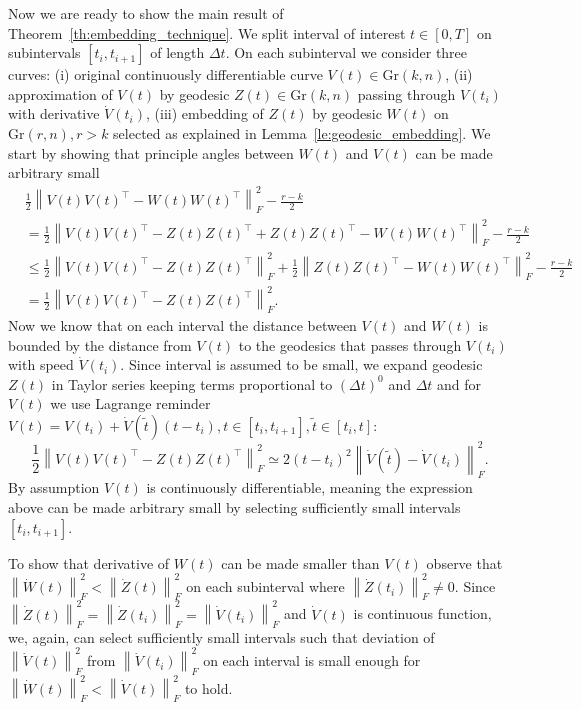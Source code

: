 \documentclass{article}
\begin{document}
Now we are ready to show the main result of Theorem~\ref{th:embedding_technique}. We split interval of interest $t\in[0, T]$ on subintervals $[t_i, t_{i+1}]$ of length $\Delta t$. On each subinterval we consider three curves: (i) original continuously differentiable curve $V(t)\in \text{Gr}(k, n)$, (ii) approximation of $V(t)$ by geodesic $Z(t)\in \text{Gr}(k, n)$ passing through $V(t_i)$ with derivative $\dot{V}(t_i)$, (iii) embedding of $Z(t)$ by geodesic $W(t)$ on $\text{Gr}(r, n), r>k$ selected as explained in Lemma~\ref{le:geodesic_embedding}. We start by showing that principle angles between $W(t)$ and $V(t)$ can be made arbitrary small
\begin{equation}
	\begin{split}
		&\frac{1}{2}\left\|V(t) V(t)^{\top} - W(t) W(t)^{\top}\right\|_{F}^2 - \frac{r - k}{2}\\
		&= \frac{1}{2}\left\|V(t) V(t)^{\top} - Z(t) Z(t)^\top + Z(t) Z(t)^\top - W(t) W(t)^{\top}\right\|_{F}^2 - \frac{r - k}{2} \\
		&\leq \frac{1}{2}\left\|V(t) V(t)^{\top} - Z(t) Z(t)^\top \right\|_{F}^2 + \frac{1}{2} \left\|Z(t) Z(t)^\top - W(t) W(t)^{\top}\right\|_{F}^2 - \frac{r - k}{2} \\
		&= \frac{1}{2}\left\|V(t) V(t)^{\top} - Z(t) Z(t)^\top \right\|_{F}^2.
	\end{split}
\end{equation}
Now we know that on each interval the distance between $V(t)$ and $W(t)$ is bounded by the distance from $V(t)$ to the geodesics that passes through $V(t_i)$ with speed $\dot{V}(t_i)$. Since interval is assumed to be small, we expand geodesic $Z(t)$ in Taylor series keeping terms proportional to $\left(\Delta t\right)^{0}$ and $\Delta t$ and for $V(t)$ we use Lagrange reminder $V(t) = V(t_i) + \dot{V}(\widetilde{t}) (t - t_i), t\in[t_i,t_{i+1}],\widetilde{t}\in[t_i, t]$:
\begin{equation}
	\frac{1}{2}\left\|V(t) V(t)^{\top} - Z(t) Z(t)^\top \right\|_{F}^2 \simeq 2 (t -t_i)^2 \left\|\dot{V}(\widetilde{t}) - \dot{V}(t_{i})\right\|_{F}^2.
\end{equation}
By assumption $V(t)$ is continuously differentiable, meaning the expression above can be made arbitrary small by selecting sufficiently small intervals $[t_i, t_{i+1}]$.

To show that derivative of $W(t)$ can be made smaller than $V(t)$ observe that $\left\|\dot{W}(t)\right\|_{F}^2 < \left\|\dot{Z}(t)\right\|_{F}^2$ on each subinterval where $\left\|\dot{Z}(t_i)\right\|_{F}^2 \neq 0$. Since $\left\|\dot{Z}(t)\right\|_{F}^2 = \left\|\dot{Z}(t_i)\right\|_{F}^2 = \left\|\dot{V}(t_i)\right\|_{F}^2$ and $\dot{V}(t)$ is continuous function, we, again, can select sufficiently small intervals such that deviation of $\left\|\dot{V}(t)\right\|_{F}^2$ from $\left\|\dot{V}(t_i)\right\|_{F}^2$ on each interval is small enough for $\left\|\dot{W}(t)\right\|_{F}^2 < \left\|\dot{V}(t)\right\|_{F}^2$ to hold.
\end{document}
